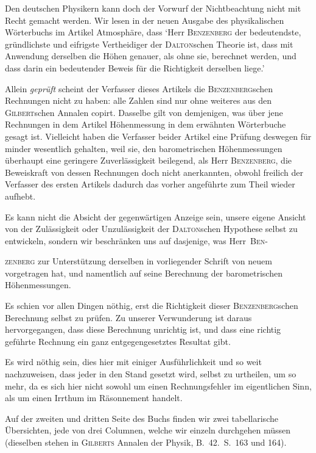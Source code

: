 Den deutschen Physikern kann doch der Vorwurf der Nichtbeachtung nicht mit Recht gemacht werden. Wir lesen in der neuen Ausgabe des physikalischen Wörterbuchs im Artikel Atmosphäre, dass `Herr \textsc{Benzenberg} der bedeutendste, gründlichste und eifrigste Vertheidiger der \textsc{Dalton}schen Theorie ist, dass mit Anwendung derselben die Höhen genauer, als ohne sie, berechnet werden, und dass darin ein bedeutender Beweis für die Richtigkeit derselben liege.'

Allein \textit{geprüft} scheint der Verfasser dieses Artikels die \textsc{Benzenberg}schen Rechnungen nicht zu haben: alle Zahlen sind nur ohne weiteres aus den \textsc{Gilbert}schen Annalen copirt. Dasselbe gilt von demjenigen, was über jene Rechnungen in dem Artikel Höhenmessung in dem erwähnten Wörterbuche gesagt ist. Vielleicht haben die Verfasser beider Artikel eine Prüfung deswegen für minder wesentlich gehalten, weil sie, den barometrischen Höhenmessungen überhaupt eine geringere Zuverlässigkeit beilegend, als Herr \textsc{Benzenberg}, die Beweiskraft von dessen Rechnungen doch nicht anerkannten, obwohl freilich der Verfasser des ersten Artikels dadurch das vorher angeführte zum Theil wieder aufhebt.

Es kann nicht die Absicht der gegenwärtigen Anzeige sein, unsere eigene Ansicht von der Zulässigkeit oder Unzulässigkeit der \textsc{Dalton}schen Hypothese selbst zu entwickeln, sondern wir beschränken uns auf dasjenige, was Herr~\textsc{Ben}-\par\clearpage
{}
\noindent \textsc{zenberg} zur Unterstützung derselben in vorliegender Schrift von neuem vorgetragen hat, und namentlich auf seine Berechnung der barometrischen Höhenmessungen.

Es schien vor allen Dingen nöthig, erst die Richtigkeit dieser \textsc{Benzenberg}schen Berechnung selbst zu prüfen. Zu unserer Verwunderung ist daraus hervorgegangen, dass diese Berechnung unrichtig ist, und dass eine richtig geführte Rechnung ein ganz entgegengesetztes Resultat gibt.

Es wird nöthig sein, dies hier mit einiger Ausführlichkeit und so weit nachzuweisen, dass jeder in den Stand gesetzt wird, selbst zu urtheilen, um so mehr, da es sich hier nicht sowohl um einen Rechnungsfehler im eigentlichen Sinn, als um einen Irrthum im Räsonnement handelt.

Auf der zweiten und dritten Seite des Buchs finden wir zwei tabellarische Übersichten, jede von drei Columnen, welche wir einzeln durchgehen müssen (dieselben stehen in \textsc{Gilberts} Annalen der Physik, B.\ 42.\ S.\ 163 und 164).

